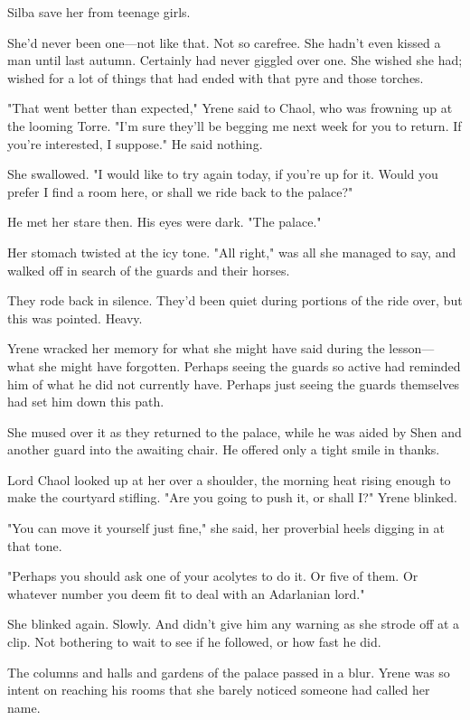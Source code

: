 Silba save her from teenage girls.

She'd never been one---not like that. Not so carefree. She hadn't even kissed a man until last autumn. Certainly had never giggled over one. She wished she had; wished for a lot of things that had ended with that pyre and those torches.

"That went better than expected," Yrene said to Chaol, who was frowning up at the looming Torre. "I'm sure they'll be begging me next week for you to return. If you're interested, I suppose." He said nothing.

She swallowed. "I would like to try again today, if you're up for it. Would you prefer I find a room here, or shall we ride back to the palace?"

He met her stare then. His eyes were dark. "The palace."

Her stomach twisted at the icy tone. "All right," was all she managed to say, and walked off in search of the guards and their horses.

They rode back in silence. They'd been quiet during portions of the ride over, but this was  pointed. Heavy.

Yrene wracked her memory for what she might have said during the lesson--- what she might have forgotten. Perhaps seeing the guards so active had reminded him of what he did not currently have. Perhaps just seeing the guards themselves had set him down this path.

She mused over it as they returned to the palace, while he was aided by Shen and another guard into the awaiting chair. He offered only a tight smile in thanks.

Lord Chaol looked up at her over a shoulder, the morning heat rising enough to make the courtyard stifling. "Are you going to push it, or shall I?" Yrene blinked.

"You can move it yourself just fine," she said, her proverbial heels digging in at that tone.

"Perhaps you should ask one of your acolytes to do it. Or five of them. Or whatever number you deem fit to deal with an Adarlanian lord."

She blinked again. Slowly. And didn't give him any warning as she strode off at a clip. Not bothering to wait to see if he followed, or how fast he did.

The columns and halls and gardens of the palace passed in a blur. Yrene was so intent on reaching his rooms that she barely noticed someone had called her name.

